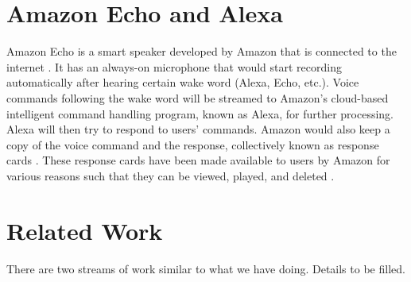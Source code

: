\section{Amazon Echo and Alexa}
Amazon Echo is a smart speaker developed by Amazon that is connected to the internet \cite{wikipedia_2019}. It has an always-on microphone that would start recording automatically after hearing certain wake word (Alexa, Echo, etc.). Voice commands following the wake word will be streamed to Amazon's cloud-based intelligent command handling program, known as Alexa, for further processing. Alexa will then try to respond to users' commands. Amazon would also keep a copy of the voice command and the response, collectively known as response cards \cite{ford2019alexa}. These response cards have been made available to users by Amazon for various reasons such that they can be viewed, played, and deleted \cite{amazon_2010}. 

\section{Related Work}
There are two streams of work similar to what we have doing. Details to be filled.